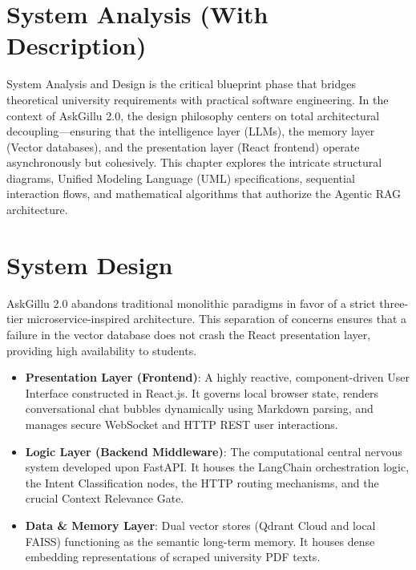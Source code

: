 \documentclass[12pt,a4paper]{report}
\begin{document}
\section{System Analysis (With Description)}
System Analysis and Design is the critical blueprint phase that bridges theoretical university requirements with practical software engineering. In the context of AskGillu 2.0, the design philosophy centers on total architectural decoupling---ensuring that the intelligence layer (LLMs), the memory layer (Vector databases), and the presentation layer (React frontend) operate asynchronously but cohesively. This chapter explores the intricate structural diagrams, Unified Modeling Language (UML) specifications, sequential interaction flows, and mathematical algorithms that authorize the Agentic RAG architecture.

\section{System Design}
AskGillu 2.0 abandons traditional monolithic paradigms in favor of a strict three-tier microservice-inspired architecture. This separation of concerns ensures that a failure in the vector database does not crash the React presentation layer, providing high availability to students.
\begin{itemize}
    \item \textbf{Presentation Layer (Frontend)}: A highly reactive, component-driven User Interface constructed in React.js. It governs local browser state, renders conversational chat bubbles dynamically using Markdown parsing, and manages secure WebSocket and HTTP REST user interactions.
    \item \textbf{Logic Layer (Backend Middleware)}: The computational central nervous system developed upon FastAPI. It houses the LangChain orchestration logic, the Intent Classification nodes, the HTTP routing mechanisms, and the crucial Context Relevance Gate.
    \item \textbf{Data \& Memory Layer}: Dual vector stores (Qdrant Cloud and local FAISS) functioning as the semantic long-term memory. It houses dense embedding representations of scraped university PDF texts. 
\end{itemize}
\end{document}
